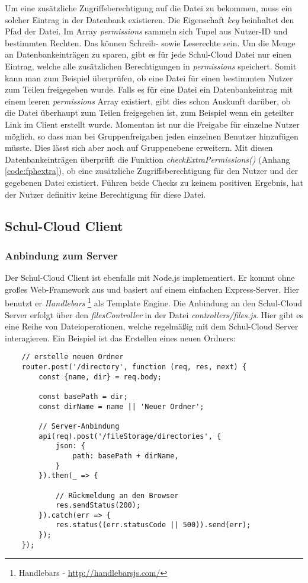 Um eine zusätzliche Zugriffsberechtigung auf die Datei zu bekommen, muss ein solcher Eintrag in der Datenbank existieren. Die Eigenschaft \textit{key} beinhaltet den Pfad der Datei. Im Array \textit{permissions} sammeln sich Tupel aus Nutzer-ID und bestimmten Rechten. Das können Schreib- sowie Leserechte sein. Um die Menge an Datenbankeinträgen zu sparen, gibt es für jede Schul-Cloud Datei nur einen Eintrag, welche alle zusätzlichen Berechtigungen in \textit{permissions} speichert. Somit kann man zum Beispiel überprüfen, ob eine Datei für einen bestimmten Nutzer zum Teilen freigegeben wurde. Falls es für eine Datei ein Datenbankeintrag mit einem leeren \textit{permissions} Array existiert, gibt dies schon Auskunft darüber, ob die Datei überhaupt zum Teilen freigegeben ist, zum Beispiel wenn ein geteilter Link im Client erstellt wurde. Momentan ist nur die Freigabe für einzelne Nutzer möglich, so dass man bei Gruppenfreigaben jeden einzelnen Benutzer hinzufügen müsste. Dies lässt sich aber noch auf Gruppenebene erweitern. Mit diesen Datenbankeinträgen überprüft die Funktion \textit{checkExtraPermissions()} (Anhang \ref{code:fphextra}), ob eine zusätzliche Zugriffsberechtigung für den Nutzer und der gegebenen Datei existiert. Führen beide Checks zu keinem positiven Ergebnis, hat der Nutzer definitiv keine Berechtigung für diese Datei.

\subsection{Schul-Cloud Client}
\label{sec:client}

\subsubsection{Anbindung zum Server}
Der Schul-Cloud Client ist ebenfalls mit Node.js implementiert. Er kommt ohne großes Web-Framework aus und basiert auf einem einfachen Express-Server. Hier benutzt er \textit{Handlebars} \footnote{Handlebars - \url{http://handlebarsjs.com/}} als Template Engine. Die Anbindung an den Schul-Cloud Server erfolgt über den \textit{filesController} in der  Datei \textit{controllers/files.js}. Hier gibt es eine Reihe von Dateioperationen, welche regelmäßig mit dem Schul-Cloud Server interagieren. Ein Beispiel ist das Erstellen eines neuen Ordners:

\begin{lstlisting}
	// erstelle neuen Ordner
	router.post('/directory', function (req, res, next) {
		const {name, dir} = req.body;
	
		const basePath = dir;
		const dirName = name || 'Neuer Ordner';
		
		// Server-Anbindung
		api(req).post('/fileStorage/directories', {
			json: {
				path: basePath + dirName,
			}
		}).then(_ => {
			
			// Rückmeldung an den Browser
			res.sendStatus(200);
		}).catch(err => {
			res.status((err.statusCode || 500)).send(err);
		});
	});
\end{lstlisting} 


